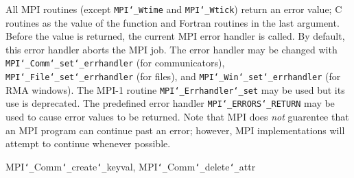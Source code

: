 \par
{}
\par
All MPI routines (except {\tt MPI{\tt \char`\_}Wtime} and {\tt MPI{\tt \char`\_}Wtick}) return an error value;
C routines as the value of the function and Fortran routines in the last
argument.  Before the value is returned, the current MPI error handler is
called.  By default, this error handler aborts the MPI job.  The error handler
may be changed with {\tt MPI{\tt \char`\_}Comm{\tt \char`\_}set{\tt \char`\_}errhandler} (for communicators),
{\tt MPI{\tt \char`\_}File{\tt \char`\_}set{\tt \char`\_}errhandler} (for files), and {\tt MPI{\tt \char`\_}Win{\tt \char`\_}set{\tt \char`\_}errhandler} (for
RMA windows).  The MPI-1 routine {\tt MPI{\tt \char`\_}Errhandler{\tt \char`\_}set} may be used but
its use is deprecated.  The predefined error handler
{\tt MPI{\tt \char`\_}ERRORS{\tt \char`\_}RETURN} may be used to cause error values to be returned.
Note that MPI does {\em not} guarentee that an MPI program can continue past
an error; however, MPI implementations will attempt to continue whenever
possible.
\par
{}
\par
{}
MPI{\tt \char`\_}Comm{\tt \char`\_}create{\tt \char`\_}keyval, MPI{\tt \char`\_}Comm{\tt \char`\_}delete{\tt \char`\_}attr
\nextline
{}
\endmanpage

